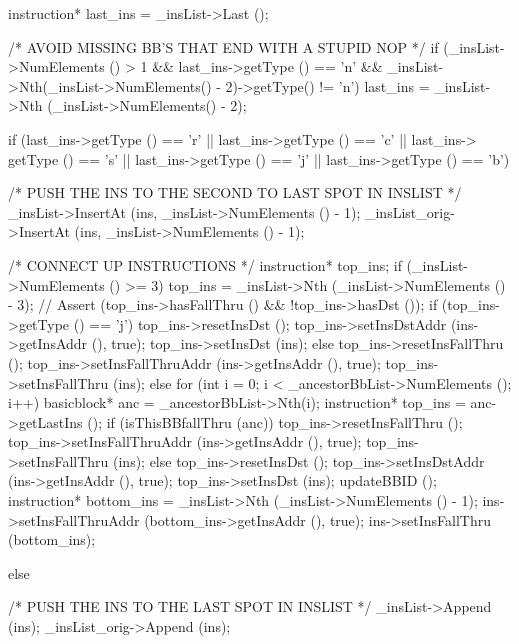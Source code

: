 \begin{DoxyCode}
                                            {
    instruction* last_ins = _insList->Last ();

    /* AVOID MISSING BB'S THAT END WITH A STUPID NOP */
    if (_insList->NumElements () > 1 &&
        last_ins->getType () == 'n' && 
        _insList->Nth(_insList->NumElements() - 2)->getType() != 'n')
        last_ins = _insList->Nth (_insList->NumElements() - 2);

    if (last_ins->getType () == 'r' || last_ins->getType () == 'c' || last_ins->
      getType () == 's' || 
        last_ins->getType () == 'j' || last_ins->getType () == 'b') {
        /* PUSH THE INS TO THE SECOND TO LAST SPOT IN INSLIST */
        _insList->InsertAt (ins, _insList->NumElements () - 1);
        _insList_orig->InsertAt (ins, _insList->NumElements () - 1);

        /* CONNECT UP INSTRUCTIONS */
        instruction* top_ins;
        if (_insList->NumElements () >= 3) {
            top_ins = _insList->Nth (_insList->NumElements () - 3);
//            Assert (top_ins->hasFallThru () && !top_ins->hasDst ());
            if (top_ins->getType () == 'j') {
                top_ins->resetInsDst ();
                top_ins->setInsDstAddr (ins->getInsAddr (), true);
                top_ins->setInsDst (ins);
            } else {
                top_ins->resetInsFallThru ();
                top_ins->setInsFallThruAddr (ins->getInsAddr (), true);
                top_ins->setInsFallThru (ins);
            }
        } else {
            for (int i = 0; i < _ancestorBbList->NumElements (); i++) {
                basicblock* anc = _ancestorBbList->Nth(i);
                instruction* top_ins = anc->getLastIns ();
                if (isThisBBfallThru (anc)) {
                    top_ins->resetInsFallThru ();
                    top_ins->setInsFallThruAddr (ins->getInsAddr (), true);
                    top_ins->setInsFallThru (ins);
                } else {
                    top_ins->resetInsDst ();
                    top_ins->setInsDstAddr (ins->getInsAddr (), true);
                    top_ins->setInsDst (ins);
                }
            }
            updateBBID ();
        }
        instruction* bottom_ins = _insList->Nth (_insList->NumElements () - 1);
        ins->setInsFallThruAddr (bottom_ins->getInsAddr (), true);
        ins->setInsFallThru (bottom_ins);
    } else {
        /* PUSH THE INS TO THE LAST SPOT IN INSLIST */
        _insList->Append (ins);
        _insList_orig->Append (ins);

}}
\end{DoxyCode}
